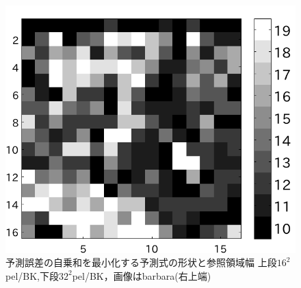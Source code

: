 \documentclass[25pt, landscape,dvipdfmx]{foils}
\begin{document}
\begin{figure}[b]
\begin{flushleft}
\includegraphics[angle=-90,scale=0.75]{fig/test1/b32/yosokusikihaba.pdf}\\
予測誤差の自乗和を最小化する予測式の形状と参照領域幅
上段$16^2$pel/BK,下段$32^2$pel/BK，画像はbarbara(右上端)
\end{flushleft}
\end{figure}
\newpage
\end{document}
